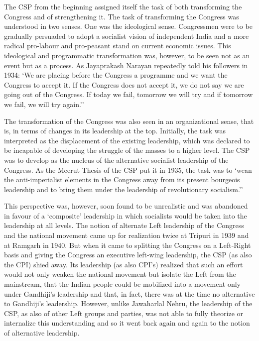\begin{multicols}{2}
The CSP from the beginning assigned itself the task of both transforming the Congress and of strengthening it. The task of transforming the Congress was understood in two senses. One was the ideological sense. Congressmen were to be gradually persuaded to adopt a socialist vision of independent India and a more radical pro-labour and pro-peasant stand on current economic issues. This ideological and programmatic transformation was, however, to be seen not as an event but as a process. As Jayaprakash Narayan repeatedly told his followers in 1934: `We are placing before the Congress a programme and we want the Congress to accept it. If the Congress does not accept it, we do not say we are going out of the Congress. If today we fail, tomorrow we will try and if tomorrow we fail, we will try again.'' 

The transformation of the Congress was also seen in an organizational sense, that is, in terms of changes in its leadership at the top. Initially, the task was interpreted as the displacement of the existing leadership, which was declared to be incapable of developing the struggle of the masses to a higher level. The CSP was to develop as the nucleus of the alternative socialist leadership of the Congress. As the Meerut Thesis of the CSP put it in 1935, the task was to `wean the anti-imperialist elements in the Congress away from its present bourgeois leadership and to bring them under the leadership of revolutionary socialism.'' 

This perspective was, however, soon found to be unrealistic and was abandoned in favour of a `composite' leadership in which socialists would be taken into the leadership at all levels. The notion of alternate Left leadership of the Congress and the national movement came up for realization twice at Tripuri in 1939 and at Ramgarh in 1940. But when it came to splitting the Congress on a Left-Right basis and giving the Congress an executive left-wing leadership, the CSP (as also the CPI) shied away. Its leadership (as also CPI's) realized that such an effort would not only weaken the national movement but isolate the Left from the mainstream, that the Indian people could be mobilized into a movement only under Gandhiji's leadership and that, in fact, there was at the time no alternative to Gandhiji's leadership. However, unlike Jawaharlal Nehru, the leadership of the CSP, as also of other Left groups and parties, was not able to fully theorize or internalize this understanding and so it went back again and again to the notion of alternative leadership. 


\end{multicols}
